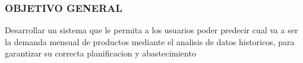 \subsubsection{OBJETIVO GENERAL}
Desarrollar un sistema que le permita a los usuarios poder predecir cual va a ser la demanda mensual de productos mediante el analisis de datos historicos, para garantizar su correcta planificacion y abastecimiento
